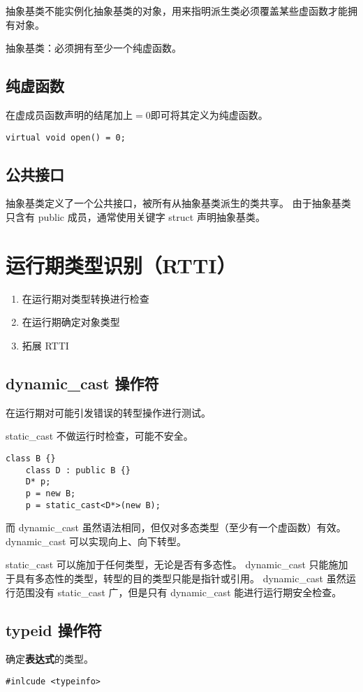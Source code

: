 抽象基类不能实例化抽象基类的对象，用来指明派生类必须覆盖某些虚函数才能拥有对象。

抽象基类：必须拥有至少一个纯虚函数。

\subsection{纯虚函数}

在虚成员函数声明的结尾加上$=0$即可将其定义为纯虚函数。

\begin{lstlisting}[frame=shadowbox]
    virtual void open() = 0;
\end{lstlisting}

\subsection{公共接口}

抽象基类定义了一个公共接口，被所有从抽象基类派生的类共享。
由于抽象基类只含有 public 成员，通常使用关键字 struct 声明抽象基类。

\section{运行期类型识别（RTTI）}

\begin{enumerate}
    \item 在运行期对类型转换进行检查
    \item 在运行期确定对象类型
    \item 拓展 RTTI 
\end{enumerate}

\subsection{dynamic\_cast 操作符}

在运行期对可能引发错误的转型操作进行测试。

static\_cast 不做运行时检查，可能不安全。
\begin{lstlisting}[frame=shadowbox]
    class B {}
    class D : public B {}
    D* p;
    p = new B;
    p = static_cast<D*>(new B);
\end{lstlisting}

而 dynamic\_cast 虽然语法相同，但仅对多态类型（至少有一个虚函数）有效。
dynamic\_cast 可以实现向上、向下转型。

static\_cast 可以施加于任何类型，无论是否有多态性。
dynamic\_cast 只能施加于具有多态性的类型，转型的目的类型只能是指针或引用。
dynamic\_cast 虽然运行范围没有 static\_cast 广，但是只有 dynamic\_cast 能进行运行期安全检查。

\subsection{typeid 操作符}

确定\textbf{表达式}的类型。

\begin{lstlisting}[frame=shadowbox]
#inlcude <typeinfo>
\end{lstlisting}

\newpage